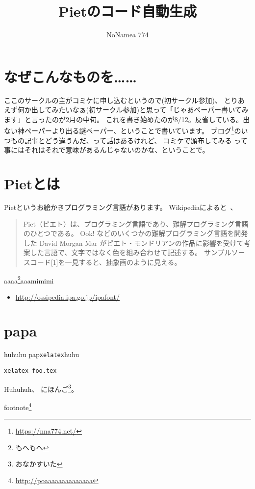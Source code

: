 \documentclass[twocolumn,8pt,b5paper]{extarticle}
\title{Pietのコード自動生成}
\author{NoNamea 774}
\begin{document}
\maketitle

\section{なぜこんなものを……}
ここのサークルの主がコミケに申し込むというので(初サークル参加)、
とりあえず何か出してみたいなぁ(初サークル参加)と思って「じゃあペーパー書いてみます」と言ったのが2月の中旬。
これを書き始めたのが8/12。反省している。出ない神ペーパーより出る謎ペーパー、ということで書いています。
ブログ\footnote{\url{https://nna774.net/}}のいつもの記事とどう違うんだ、って話はあるけれど、
コミケで頒布してみる って事にはそれはそれで意味があるんじゃないのかな、ということで。

\section{Pietとは}
Pietというお絵かきプログラミング言語があります。
Wikipediaによると~\cite{wppiet}、
\begin{quotation}
Piet（ピエト）は、プログラミング言語であり、難解プログラミング言語のひとつである。
Ook! などのいくつかの難解プログラミング言語を開発した David Morgan-Mar がピエト・モンドリアンの作品に影響を受けて考案した言語で、文字ではなく色を組み合わせて記述する。 サンプルソースコード[1]を一見すると、抽象画のように見える。
\end{quotation}

aaaa\footnote{もへもへ}aaamimimi
\begin{itemize}
\item \url{http://ossipedia.ipa.go.jp/ipafont/}
\end{itemize}

\section{papa}
huhuhu
pap{\tt xelatex}huhu

\begin{lstlisting}[frame=shadowbox]
xelatex foo.tex
\end{lstlisting}

\newpage

Huhuhuh、
にほんご\footnote[42]{おなかすいた}。


footnote\footnote{\url{http://poaaaaaaaaaaaaaa}}


\printbibliography 
\end{document}
